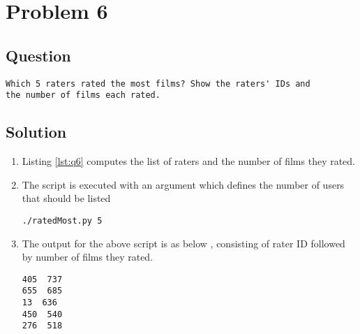 \section{Problem 6}
\label{part6}
\subsection*{Question}
\begingroup
\begin{verbatim}
Which 5 raters rated the most films? Show the raters' IDs and
the number of films each rated.
\end{verbatim}
\subsection{Solution}
\begin{enumerate}
\item Listing \ref{lst:q6} computes the list of raters and the number of films they rated.
\item The script is executed with an argument which defines the number of users that should be listed
\begin{lstlisting}[frame=single]
./ratedMost.py 5
\end{lstlisting}
\item The output for the above script is as below , consisting of rater ID followed by number of films they rated.
\begin{lstlisting}[frame=single]
405  737
655  685
13  636
450  540
276  518
\end{lstlisting}

\end{enumerate}

\newpage

\newpage


